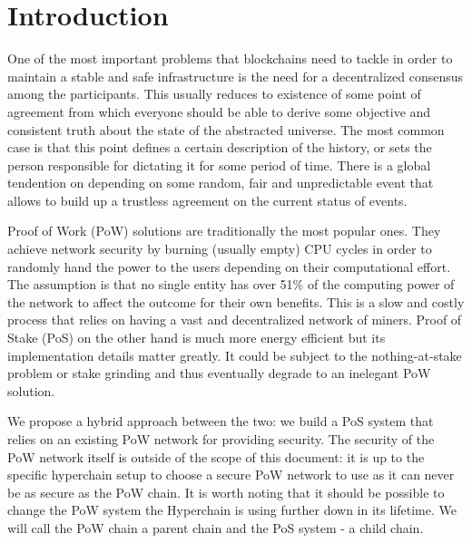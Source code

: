 \section{Introduction}

One of the most important problems that blockchains need to tackle in order to
maintain a stable and safe infrastructure is the need for a decentralized
consensus among the participants. This usually reduces to existence of some
point of agreement from which everyone should be able to derive some objective
and consistent truth about the state of the abstracted universe. The most common
case is that this point defines a certain description of the history, or sets
the person responsible for dictating it for some period of time. There is a
global tendention on depending on some random, fair and unpredictable event that
allows to build up a trustless agreement on the current status of events.

Proof of Work (PoW) solutions are traditionally the most popular ones.
They achieve network security by burning (usually empty) CPU cycles in order to
randomly hand the power to the users depending on their computational effort.
The assumption is that no single entity has over 51\%
of the computing power of the network to affect the outcome for their own
benefits. This is a slow and costly process that relies on having
a vast and decentralized network of miners. Proof of Stake (PoS) on the other
hand is much more energy efficient but its implementation details matter
greatly. It could be subject to the nothing-at-stake problem or stake grinding and
thus eventually degrade to an inelegant PoW solution.

We propose a hybrid approach between the two: we build a PoS system that
relies on an existing PoW network for providing security. The security of the
PoW network itself is outside of the scope of this document: it is up to
the specific hyperchain setup to choose a secure PoW network to use as it
can never be as secure as the PoW chain. It is worth noting that it should
be possible to change the PoW system the Hyperchain is using further down
in its lifetime. We will call the PoW chain a parent chain and the PoS system
- a child chain.

